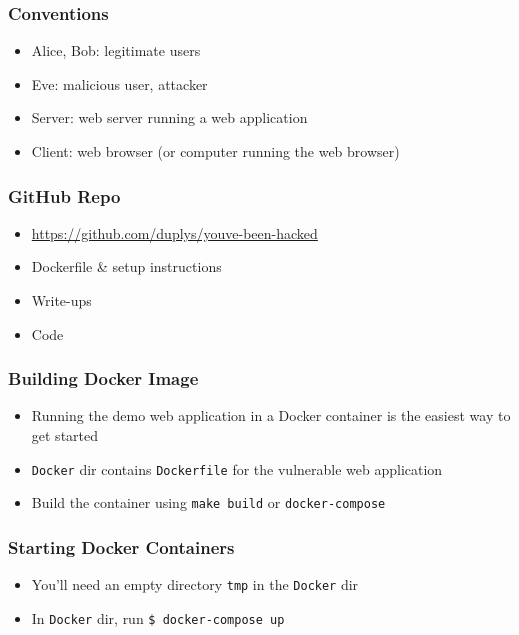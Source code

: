 \begin{frame}
	\frametitle{Conventions}
	\begin{itemize}
		\item Alice, Bob: legitimate users
		\item Eve: malicious user, attacker
		\item Server: web server running a web application
		\item Client: web browser (or computer running the web browser)
	\end{itemize}
\end{frame}


\begin{frame}
	\frametitle{GitHub Repo}
	\begin{itemize}
		\item \url{https://github.com/duplys/youve-been-hacked}
		\item Dockerfile \& setup instructions
		\item Write-ups
		\item Code
	\end{itemize}
\end{frame}

\begin{frame}
	\frametitle{Building Docker Image}
	\begin{itemize}
		\item Running the demo web application in a Docker container is the easiest way to get started
		\item \texttt{Docker} dir contains \texttt{Dockerfile} for the vulnerable web application
		\item Build the container using \texttt{make build} or \texttt{docker-compose}
	\end{itemize}
		
\end{frame}

\begin{frame}[fragile]
	\frametitle{Starting Docker Containers}
	\begin{itemize}
		\item You'll need an empty directory \texttt{tmp} in the \texttt{Docker} dir
		\item In \texttt{Docker} dir, run \verb|$ docker-compose up|
	\end{itemize}
\end{frame}

